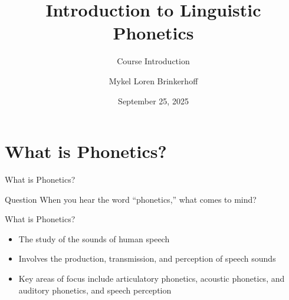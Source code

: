 \documentclass{beamer}
\title[LING 450/550] %
{Introduction to Linguistic Phonetics}
\subtitle{Course Introduction}
\author[Brinkerhoff] %
{Mykel Loren Brinkerhoff}
\institute[UW] %
{University of Washington}
\date[2025-09-25] %
{September 25, 2025}
\begin{document}
\begin{frame}
  \titlepage
\end{frame}





\section{What is Phonetics?}
\begin{frame}{What is Phonetics?}
\begin{block}{Question}
    When you hear the word ``phonetics,'' what comes to mind?
\end{block}
\end{frame}

\begin{frame}{What is Phonetics?}
  \begin{itemize}
    \item <1-> The study of the sounds of human speech
    \item <2-> Involves the production, transmission, and perception of speech sounds
    \item <3-> Key areas of focus include articulatory phonetics, acoustic phonetics, and auditory phonetics, and speech perception
  \end{itemize}
\end{frame}

\end{document}
